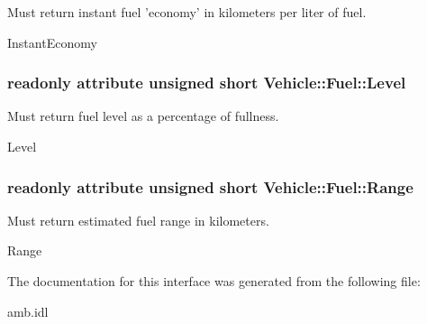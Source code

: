 Must return instant fuel 'economy' in kilometers per liter of fuel. 

Instant\-Economy \hypertarget{interfaceVehicle_1_1Fuel_a817cb4ce8e1f3a2cb70149c4043b32da}{
\subsubsection[{Level}]{\setlength{\rightskip}{0pt plus 5cm}readonly attribute unsigned short Vehicle\-::\-Fuel\-::\-Level}}\label{interfaceVehicle_1_1Fuel_a817cb4ce8e1f3a2cb70149c4043b32da}


Must return fuel level as a percentage of fullness. 

Level \hypertarget{interfaceVehicle_1_1Fuel_a73c23d52245a14a5e4ab19e07e3a95ca}{
\subsubsection[{Range}]{\setlength{\rightskip}{0pt plus 5cm}readonly attribute unsigned short Vehicle\-::\-Fuel\-::\-Range}}\label{interfaceVehicle_1_1Fuel_a73c23d52245a14a5e4ab19e07e3a95ca}


Must return estimated fuel range in kilometers. 

Range 

The documentation for this interface was generated from the following file\-:\begin{DoxyCompactItemize}
\item 
amb.\-idl\end{DoxyCompactItemize}
